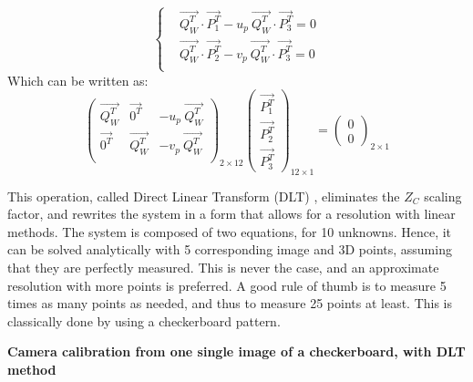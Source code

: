   \begin{equation}
    \begin{cases}
      & \overrightarrow{Q_W^T} \cdot \overrightarrow{P_1^T} - u_p \ \overrightarrow{Q_W^T} \cdot \overrightarrow{P_3^T} = 0\\
      & \overrightarrow{Q_W^T} \cdot \overrightarrow{P_2^T} - v_p \ \overrightarrow{Q_W^T} \cdot \overrightarrow{P_3^T} = 0\\
    \end{cases}
  \end{equation}
  Which can be written as:
  \begin{equation}\label{eq:calib}
    \boxed{
      \begin{pmatrix}
        \overrightarrow{Q_W^T} & \overrightarrow{0^T} & - u_p \ \overrightarrow{Q_W^T}\\   
        \overrightarrow{0^T} & \overrightarrow{Q_W^T} & - v_p \ \overrightarrow{Q_W^T} \\ 
      \end{pmatrix}_{\!\!2\times 12}
      \begin{pmatrix} \overrightarrow{P_1^T} \\ \overrightarrow{P_2^T} \\ \overrightarrow{P_3^T} \end{pmatrix}_{\!\!12\times 1}
      = \begin{pmatrix} 0 \\ 0 \end{pmatrix}_{\!\!2\times 1}
    }
  \end{equation}

This operation, called Direct Linear Transform (DLT) \cite{Sutherland1974}, eliminates the $Z_C$ scaling factor, and rewrites the system in a form that allows for a resolution with linear methods. The system is composed of two equations, for 10 unknowns. Hence, it can be solved analytically with 5 corresponding image and 3D points, assuming that they are perfectly measured. This is never the case, and an approximate resolution with more points is preferred. A good rule of thumb is to measure 5 times as many points as needed, and thus to measure 25 points at least. This is classically done by using a checkerboard pattern. 

\vspace*{0.5cm}
\noindent\textbf{Camera calibration from one single image of a checkerboard, with DLT method}


